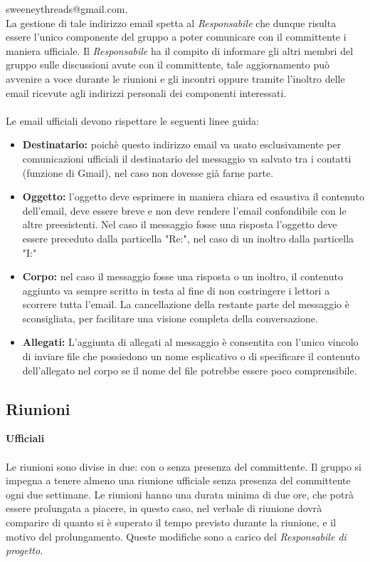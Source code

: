 \documentclass[a4paper]{report}
\begin{document}
	{sweeneythreads@gmail.com}. \\ La gestione di 
	tale indirizzo email spetta al \emph{Responsabile} che dunque risulta essere l'unico componente del gruppo a poter comunicare
	con il committente i maniera ufficiale. Il \emph{Responsabile} ha il compito di informare gli altri membri del gruppo sulle 
	discussioni avute con il committente, tale aggiornamento può avvenire a voce durante le riunioni e gli incontri oppure tramite
	l'inoltro delle email ricevute agli indirizzi personali dei componenti interessati.
	\\ \\
	Le email ufficiali devono rispettare le seguenti linee guida:
	\begin{itemize}
		\item \textbf{Destinatario:} poichè questo indirizzo email va usato esclusivamente per comunicazioni ufficiali il destinatario
		del messaggio va salvato tra i contatti (funzione di Gmail), nel caso non dovesse già farne parte.
		\item \textbf{Oggetto:} l'oggetto deve esprimere in maniera chiara ed esaustiva il contenuto dell'email, deve essere breve
		 e non deve rendere l'email confondibile con le altre preesistenti. 
		 Nel caso il messaggio fosse una risposta l'oggetto deve essere preceduto dalla particella "Re:", nel caso di un inoltro dalla
		 particella "I:"
		\item \textbf{Corpo:} nel caso il messaggio fosse una risposta o un inoltro, il contenuto aggiunto va sempre scritto in testa al
		fine di non costringere i lettori a scorrere tutta l'email. La cancellazione della restante parte del messaggio è sconsigliata, per
		facilitare una visione completa della conversazione.
		\item \textbf{Allegati:} L'aggiunta di allegati al messaggio è consentita con l'unico vincolo di inviare file che possiedono un nome
		esplicativo o di specificare il contenuto dell'allegato nel corpo se il nome del file potrebbe essere poco comprensibile.
	\end{itemize}										
	\subsection{Riunioni}
	\textbf{Ufficiali} \\ \\
		Le riunioni sono divise in due: con o senza presenza del committente. Il gruppo si impegna a tenere almeno una riunione
		ufficiale senza presenza del committente ogni due settimane. Le riunioni hanno una durata minima di due ore, che potrà 
		essere prolungata a piacere, in questo caso, nel verbale di riunione dovrà comparire di quanto si è superato il tempo
		previsto durante la riunione, e il motivo del prolungamento. Queste modifiche sono a carico del \emph{Responsabile di progetto}.
		
\end{document}
